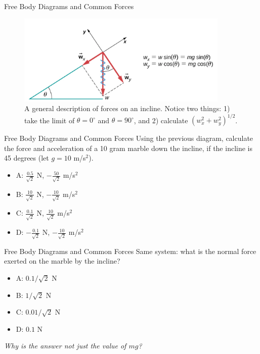 \documentclass{beamer}
\begin{document}
\begin{frame}{Free Body Diagrams and Common Forces}
\begin{figure}
\centering
\includegraphics[width=0.9\textwidth]{figures/incline2.png}
\caption{\label{fig:incline2} A general description of forces on an incline.  Notice two things: 1) take the limit of $\theta = 0^{\circ}$ and $\theta = 90^{\circ}$, and 2) calculate $(w_x^2+w_y^2)^{1/2}$.}
\end{figure}
\end{frame}

\begin{frame}{Free Body Diagrams and Common Forces}
Using the previous diagram, calculate the force and acceleration of a 10 gram marble down the incline, if the incline is 45 degrees (let $g = 10$ m/s$^2$).
\begin{itemize}
\item A: $\frac{0.5}{\sqrt{2}}$ N, $-\frac{50}{\sqrt{2}}$ m/s$^2$
\item B: $\frac{10}{\sqrt{2}}$ N, $-\frac{10}{\sqrt{2}}$ m/s$^2$
\item C: $\frac{0.1}{\sqrt{2}}$ N, $\frac{10}{\sqrt{2}}$ m/s$^2$
\item D: $-\frac{0.1}{\sqrt{2}}$ N, $-\frac{10}{\sqrt{2}}$ m/s$^2$
\end{itemize}
\end{frame}

\begin{frame}{Free Body Diagrams and Common Forces}
Same system: what is the normal force exerted on the marble by the incline?
\begin{itemize}
\item A: $0.1/\sqrt{2}$ N
\item B: $1/\sqrt{2}$ N
\item C: $0.01/\sqrt{2}$ N
\item D: $0.1$ N
\end{itemize}
\textit{Why is the answer not just the value of $mg$?}
\end{frame}
\end{document}
